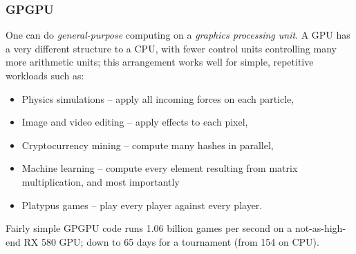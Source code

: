 \documentclass[aspectratio=169]{beamer}
\begin{document}
\begin{frame}
\begin{columns}
\begin{column}{0.5\textwidth}
\begin{center}
      \end{center}
    \end{column}
  \end{columns}
\end{frame}

\begin{frame}
  \frametitle{GPGPU}
  One can do \emph{general-purpose} computing on a
  \emph{graphics processing unit}. A GPU has a very different
  structure to a CPU, with fewer control units controlling many
  more arithmetic units; this arrangement works well for simple,
  repetitive workloads such as:

  \begin{itemize}
  \item Physics simulations -- apply all incoming forces on each particle,
  \item Image and video editing -- apply effects to each pixel,
  \item Cryptocurrency mining -- compute many hashes in parallel,
  \item Machine learning -- compute every element resulting from matrix multiplication\pause{}, and most importantly
  \item Platypus games -- play every player against every player.
  \end{itemize}

  Fairly simple GPGPU code runs 1.06 billion games per second on a
  not-as-high-end RX 580 GPU; down to 65 days for a tournament (from 154 on CPU).
\end{frame}
\end{document}
